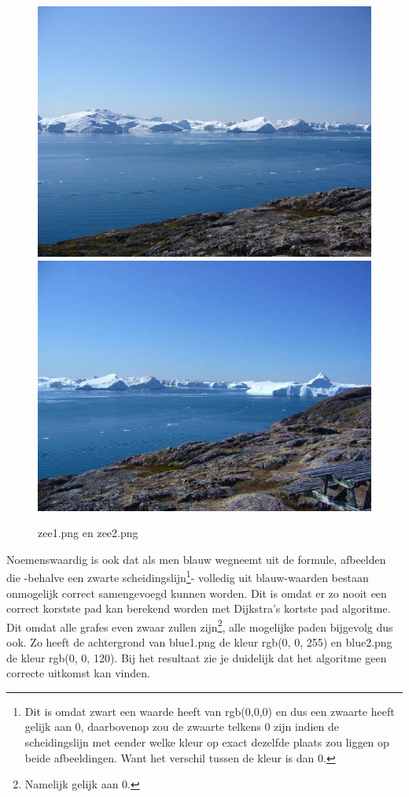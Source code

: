 \documentclass{article}
\begin{document}
\begin{figure}[h!]
\centering
\includegraphics[scale=0.2]{zee1.png}
\includegraphics[scale=0.2]{zee2.png}
\caption{zee1.png en zee2.png}
\label{fig:Zee}
\end{figure}

Noemenswaardig is ook dat als men blauw wegneemt uit de formule, afbeelden die -behalve een zwarte scheidingslijn\footnote{Dit is omdat zwart een waarde heeft van rgb(0,0,0) en dus een zwaarte heeft gelijk aan 0, daarbovenop zou de zwaarte telkens 0 zijn indien de scheidingslijn met eender welke kleur op exact dezelfde plaats zou liggen op beide afbeeldingen. Want het verschil tussen de kleur is dan 0.}- volledig uit blauw-waarden bestaan onmogelijk correct samengevoegd kunnen worden. Dit is omdat er zo nooit een correct korstste pad kan berekend worden met Dijkstra's kortste pad algoritme. Dit omdat alle grafes even zwaar zullen zijn\footnote{Namelijk gelijk aan 0.}, alle mogelijke paden bijgevolg dus ook. Zo heeft de achtergrond van blue1.png de kleur rgb(0, 0, 255) en blue2.png de kleur rgb(0, 0, 120). Bij het resultaat zie je duidelijk dat het algoritme geen correcte uitkomst kan vinden.
\end{document}
